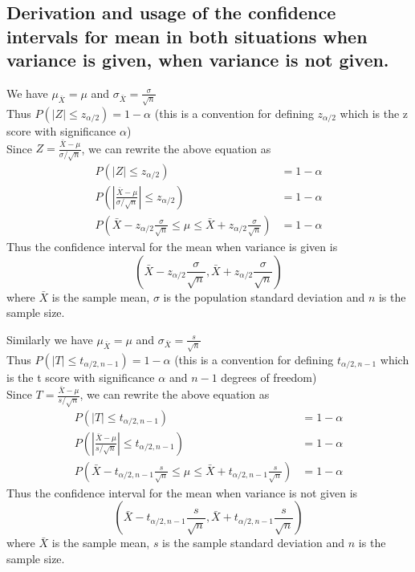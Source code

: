 \documentclass[answers,12pt,addpoints]{exam}
\begin{document}
\subsection*{Derivation and usage of the confidence intervals for mean in both situations when variance is given, when variance is not given.}
\begin{example}
    We have $\mu_{\bar{X}} = \mu$ and $\sigma_{\bar{X}} = \frac{\sigma}{\sqrt{n}}$\\
    Thus $P\left(|Z| \leq z_{\alpha/2}\right) = 1 - \alpha$ (this is a convention for defining $z_{\alpha/2}$ which is the z score with significance $\alpha$) \\
    Since $Z = \frac{\bar{X} - \mu}{\sigma/\sqrt{n}}$, we can rewrite the above equation as
    \begin{align*}
        P(|Z| \leq z_{\alpha/2}) &= 1 - \alpha\\
        P\left(\left|\frac{\bar{X} - \mu}{\sigma/\sqrt{n}}\right| \leq z_{\alpha/2}\right) &= 1 - \alpha\\
        P\left(\bar{X} - z_{\alpha/2} \frac{\sigma}{\sqrt{n}} \leq \mu \leq \bar{X} + z_{\alpha/2} \frac{\sigma}{\sqrt{n}}\right) &= 1 - \alpha
    \end{align*}
    Thus the confidence interval for the mean when variance is given is
    $$(\bar{X} - z_{\alpha/2} \frac{\sigma}{\sqrt{n}}, \bar{X} + z_{\alpha/2} \frac{\sigma}{\sqrt{n}})$$
    where $\bar{X}$ is the sample mean, $\sigma$ is the population standard deviation and $n$ is the sample size.
\end{example}
\begin{example}
    Similarly we have $\mu_{\bar{X}} = \mu$ and $\sigma_{\bar{X}} = \frac{s}{\sqrt{n}}$\\
    Thus $P\left(|T| \leq t_{\alpha/2, n-1}\right) = 1 - \alpha$ (this is a convention for defining $t_{\alpha/2, n-1}$ which is the t score with significance $\alpha$ and $n-1$ degrees of freedom) \\
    Since $T = \frac{\bar{X} - \mu}{s/\sqrt{n}}$, we can rewrite the above equation as
    \begin{align*}
        P(|T| \leq t_{\alpha/2, n-1}) &= 1 - \alpha\\
        P\left(\left|\frac{\bar{X} - \mu}{s/\sqrt{n}}\right| \leq t_{\alpha/2, n-1}\right) &= 1 - \alpha\\
        P\left(\bar{X} - t_{\alpha/2, n-1} \frac{s}{\sqrt{n}} \leq \mu \leq \bar{X} + t_{\alpha/2, n-1} \frac{s}{\sqrt{n}}\right) &= 1 - \alpha
    \end{align*}
    Thus the confidence interval for the mean when variance is not given is
    $$(\bar{X} - t_{\alpha/2, n-1} \frac{s}{\sqrt{n}}, \bar{X} + t_{\alpha/2, n-1} \frac{s}{\sqrt{n}})$$
    where $\bar{X}$ is the sample mean, $s$ is the sample standard deviation and $n$ is the sample size.
\end{example}
\end{document}
